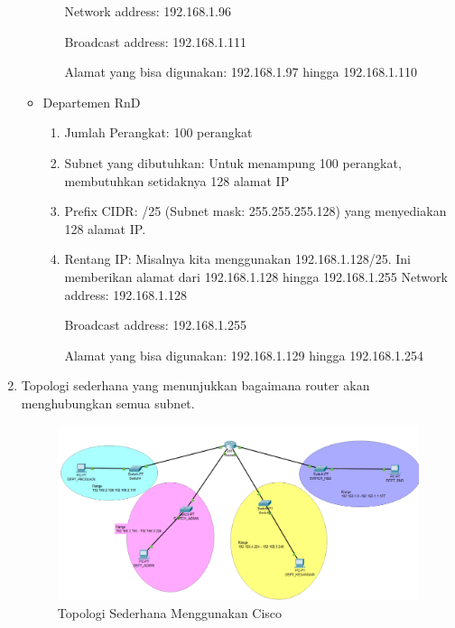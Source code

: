\begin{enumerate}
\begin{itemize}
\begin{enumerate}
		Network address: 192.168.1.96
	
		Broadcast address: 192.168.1.111
		
		Alamat yang bisa digunakan: 192.168.1.97 hingga 192.168.1.110
	\end{enumerate}
		\item Departemen RnD
		\begin{enumerate}
		\item Jumlah Perangkat: 100 perangkat
		\item Subnet yang dibutuhkan: Untuk menampung 100 perangkat, membutuhkan setidaknya 128 alamat IP
		\item Prefix CIDR: /25 (Subnet mask: 255.255.255.128) yang menyediakan 128 alamat IP.
		\item Rentang IP: Misalnya kita menggunakan 192.168.1.128/25. Ini memberikan alamat dari 192.168.1.128 hingga 192.168.1.255
		Network address: 192.168.1.128
	
		Broadcast address: 192.168.1.255
		
		Alamat yang bisa digunakan: 192.168.1.129 hingga 192.168.1.254
	\end{enumerate}
	\end{itemize}
	\item Topologi sederhana yang menunjukkan bagaimana router akan menghubungkan semua subnet.
\begin{figure}[h]
    \begin{center}
        \includegraphics[scale=0.36]{P1/img/tupenp1.png}
        \caption{Topologi Sederhana Menggunakan Cisco}
        \label{fig:tupenp1}
    \end{center}
\end{figure}


\end{enumerate}
